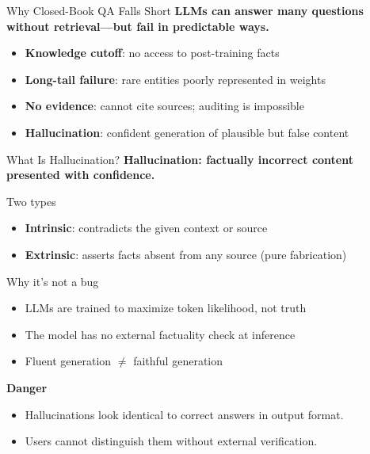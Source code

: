 \documentclass[aspectratio=169, xcolor=table]{beamer}
\newif\ifanimated
\newcommand{\cpause}{\ifanimated\pause\fi}
\begin{document}
\begin{frame}{Why Closed-Book QA Falls Short}
\textbf{LLMs can answer many questions without retrieval---but fail in predictable ways.}

\cpause

\vspace{1.0em}
\begin{itemize}
  \item \textbf{Knowledge cutoff}: no access to post-training facts
  \item \textbf{Long-tail failure}: rare entities poorly represented in weights
  \item \textbf{No evidence}: cannot cite sources; auditing is impossible
  \item \textbf{Hallucination}: confident generation of plausible but false content
\end{itemize}
\end{frame}

\begin{frame}[shrink=18]{What Is Hallucination?}
\textbf{Hallucination: factually incorrect content presented with confidence.}

\cpause

\vspace{0.7em}
\begin{block}{Two types}
\begin{itemize}
  \item \textbf{Intrinsic}: contradicts the given context or source
  \item \textbf{Extrinsic}: asserts facts absent from any source (pure fabrication)
\end{itemize}
\end{block}

\cpause
\begin{block}{Why it's not a bug}
\begin{itemize}
  \item LLMs are trained to maximize token likelihood, not truth
  \item The model has no external factuality check at inference
  \item Fluent generation $\neq$ faithful generation
\end{itemize}
\end{block}

\cpause
\textbf{Danger} \\
\begin{itemize}
  \item Hallucinations look identical to correct answers in output format.
  \item Users cannot distinguish them without external verification.
\end{itemize}
\end{frame}
\end{document}
